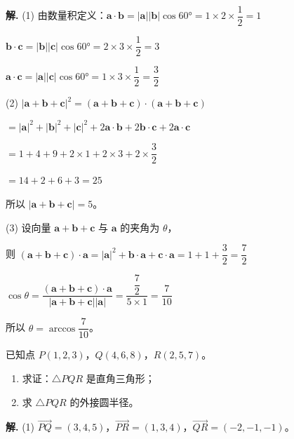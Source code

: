 \documentclass[11pt]{ctexrep}
\begin{document}
\textbf{解.} (1) 由数量积定义：$\boldsymbol{a} \cdot \boldsymbol{b} = |\boldsymbol{a}||\boldsymbol{b}|\cos 60° = 1 \times 2 \times \dfrac{1}{2} = 1$

$\boldsymbol{b} \cdot \boldsymbol{c} = |\boldsymbol{b}||\boldsymbol{c}|\cos 60° = 2 \times 3 \times \dfrac{1}{2} = 3$

$\boldsymbol{a} \cdot \boldsymbol{c} = |\boldsymbol{a}||\boldsymbol{c}|\cos 60° = 1 \times 3 \times \dfrac{1}{2} = \dfrac{3}{2}$

(2) $|\boldsymbol{a} + \boldsymbol{b} + \boldsymbol{c}|^2 = (\boldsymbol{a} + \boldsymbol{b} + \boldsymbol{c}) \cdot (\boldsymbol{a} + \boldsymbol{b} + \boldsymbol{c})$

$= |\boldsymbol{a}|^2 + |\boldsymbol{b}|^2 + |\boldsymbol{c}|^2 + 2\boldsymbol{a}\cdot\boldsymbol{b} + 2\boldsymbol{b}\cdot\boldsymbol{c} + 2\boldsymbol{a}\cdot\boldsymbol{c}$

$= 1 + 4 + 9 + 2 \times 1 + 2 \times 3 + 2 \times \dfrac{3}{2}$

$= 14 + 2 + 6 + 3 = 25$

所以 $|\boldsymbol{a} + \boldsymbol{b} + \boldsymbol{c}| = 5$。

(3) 设向量 $\boldsymbol{a} + \boldsymbol{b} + \boldsymbol{c}$ 与 $\boldsymbol{a}$ 的夹角为 $\theta$，

则 $(\boldsymbol{a} + \boldsymbol{b} + \boldsymbol{c}) \cdot \boldsymbol{a} = |\boldsymbol{a}|^2 + \boldsymbol{b}\cdot\boldsymbol{a} + \boldsymbol{c}\cdot\boldsymbol{a} = 1 + 1 + \dfrac{3}{2} = \dfrac{7}{2}$

$\cos\theta = \dfrac{(\boldsymbol{a} + \boldsymbol{b} + \boldsymbol{c}) \cdot \boldsymbol{a}}{|\boldsymbol{a} + \boldsymbol{b} + \boldsymbol{c}||\boldsymbol{a}|} = \dfrac{\dfrac{7}{2}}{5 \times 1} = \dfrac{7}{10}$

所以 $\theta = \arccos\dfrac{7}{10}$。

\begin{example}[练习]
    已知点 $P(1, 2, 3)$，$Q(4, 6, 8)$，$R(2, 5, 7)$。
    \begin{enumerate}
        \item 求证：$\triangle PQR$ 是直角三角形；
        \item 求 $\triangle PQR$ 的外接圆半径。
    \end{enumerate}
\end{example}

\textbf{解.} (1) $\overrightarrow{PQ} = (3, 4, 5)$，$\overrightarrow{PR} = (1, 3, 4)$，$\overrightarrow{QR} = (-2, -1, -1)$。
\end{document}
